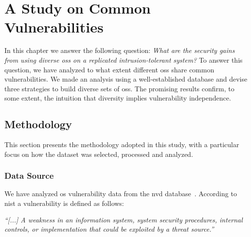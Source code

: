 \chapter{A Study on Common Vulnerabilities}
\label{chap:datasource}

In this chapter we answer the following question: \emph{What are the security gains from using diverse \glspl{os} on a replicated intrusion-tolerant system?}
To answer this question, we have analyzed to what extent different \glspl{os} share common vulnerabilities.
We made an analysis using a well-established database and devise three strategies to build diverse sets of \glspl{os}.
The promising results confirm, to some extent, the intuition that diversity implies vulnerability independence.

\section{Methodology}

This section presents the methodology adopted in this study, with a particular focus on how the dataset was selected, processed and analyzed.


\subsection{Data Source}
We have analyzed \gls{os} vulnerability data from the \gls{nvd} database~\cite{nvd}. 
According to \gls{nist} a vulnerability is defined as follows:

\begin{defn}
 \emph{``[...] A weakness in an information system, system security procedures, internal controls, or implementation that could be exploited by a threat source.''}~\cite{Nist:2012}
\end{defn}



